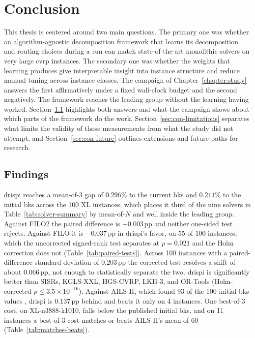 \chapter{Conclusion}\label{chapter:conclusion}

This thesis is centered around two main questions. The primary one was whether an
algorithm-agnostic decomposition framework that learns its decomposition and
routing choices during a run can match state-of-the-art monolithic solvers on
very large \gls{cvrp} instances. The secondary one was whether the weights that
learning produces give interpretable insight into instance structure and reduce
manual tuning across instance classes. The campaign of
Chapter~\ref{chapter:study} answers the first affirmatively under a
fixed wall-clock budget and the second negatively. The framework reaches the leading group without the learning
having worked. Section~\ref{sec:con-findings} highlights both answers and what the
campaign shows about which parts of the framework do the work.
Section~\ref{sec:con-limitations} separates what limits the validity of those
measurements from what the study did not attempt, and
Section~\ref{sec:con-future} outlines extensions and future paths for research.

\section{Findings}
\label{sec:con-findings}

\gls{drispi} reaches a mean-of-3 gap of $0.296\%$ to the current \gls{bks} and $0.211\%$ to
the initial \gls{bks} across the 100 XL instances, which places it third of the nine
solvers in Table~\ref{tab:solver-summary} by mean-of-$N$ and well inside the
leading group. Against FILO2 the paired difference is $+0.003$\,pp and neither
one-sided test rejects. Against FILO it is $-0.037$\,pp in \gls{drispi}'s favor, on
55 of 100 instances, which the uncorrected signed-rank test separates at
$p = 0.021$ and the Holm correction does not
\citep{demsVarStatisticalComparisonsClassifiers}
(Table~\ref{tab:paired-tests}). Across 100 instances with a paired-difference
standard deviation of $0.203$\,pp the corrected test resolves a shift of about
$0.066$\,pp, not enough to statistically separate the two. \gls{drispi} is significantly better than SISRs, KGLS-XXL, HGS-CVRP, LKH-3, and OR-Tools (Holm-corrected $p \leq 3.5 \times 10^{-16}$). Against AILS-II, which found 93 of the 100 initial \gls{bks}
values \citep{queirogaXLInstancesCapacitated2026}, \gls{drispi} is $0.137$\,pp behind and beats it only on 4
instances. One best-of-3 cost, on XL-n3888-k1010, falls below the published
initial \gls{bks}, and on 11 instances a best-of-3 cost matches or beats AILS-II's
mean-of-60 (Table~\ref{tab:matches-beats}).


